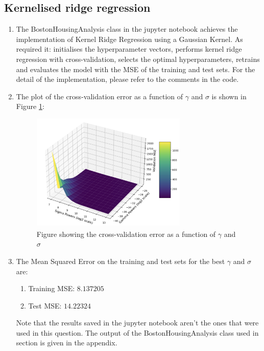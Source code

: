 \documentclass[final,3p,times,12pt]{article}
\begin{document}
\subsection{Kernelised ridge regression}

\begin{enumerate}
    \item The BostonHousingAnalysis class in the jupyter notebook achieves the implementation of Kernel Ridge Regression using a Gaussian Kernel. As required it: initialises the hyperparameter vectors, performs kernel ridge regression with cross-validation, selects the optimal hyperparameters, retrains and evaluates the model with the MSE of the training and test sets. For the detail of the implementation, please refer to the comments in the code. 

    \item  The plot of the cross-validation error as a function of $\gamma$ and $\sigma$ is shown in Figure \ref{fig:question_5}:

    \begin{figure}[H]
        \centering
        \includegraphics[width=0.7\textwidth]{images/question_5.png}
        \caption{Figure showing the cross-validation error as a function of $\gamma$ and $\sigma$}
        \label{fig:question_5}
    \end{figure}

    \item The Mean Squared Error on the training and test sets for the best $\gamma$ and $\sigma$ are: 
    \begin{enumerate}
        \item Training MSE: $8.137205$
        \item Test MSE: $14.22324$
    \end{enumerate}
    Note that the results saved in the jupyter notebook aren't the ones that were used in this question. The output of the BostonHousingAnalysis class used in section is given in the appendix. 


\end{enumerate}
\end{document}
